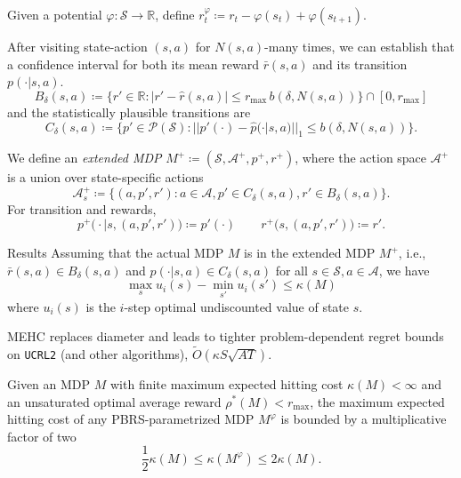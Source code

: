\documentclass[final]{beamer}
\newlength{\colwidth}
\begin{document}
\begin{frame}[t]
\begin{columns}[t]
\begin{column}{\colwidth}
  Given a potential $\varphi : \mathcal{S} \rightarrow \mathbb{R}$, define $r^\varphi_t \coloneqq r_t -\varphi(s_{t}) + \varphi(s_{t+1})$.
    
  After visiting state-action $(s, a)$ for $N(s, a)$-many times, we can establish that a confidence interval for both its mean reward $\bar{r}(s, a)$ and its transition $p(\cdot|s, a)$. 
  $$ B_\delta(s, a) \coloneqq \big\{r' \in \mathbb{R} : |r' - \hat{r}(s, a)| \leq r_\text{max} \, b(\delta, N(s, a)) \big\} \cap [0, r_\text{max}] $$
  and the statistically plausible transitions are
  $$ C_\delta(s, a) \coloneqq \big\{p' \in \mathcal{P}(\mathcal{S}) : ||p'(\cdot) - \hat{p}(\cdot|s, a)||_1 \leq b(\delta, N(s, a)) \big\}. $$

  We define an \emph{extended MDP} $M^+ \coloneqq (\mathcal{S}, \mathcal{A}^+, p^+, r^+)$, where the action space $\mathcal{A}^+$ is a union over state-specific actions
  $$ \mathcal{A}^+_s \coloneqq \{ (a, p', r') : a \in \mathcal{A}, p' \in C_\delta(s, a), r' \in B_\delta(s, a) \}. $$
  For transition and rewards, 
  $$ p^+\big(\cdot|s, (a, p', r') \big) \coloneqq p'(\cdot) \qquad r^+\big(s, (a, p', r')\big) \coloneqq r'. $$
    
  \begin{block}{Results}
  Assuming that the actual MDP $M$ is in the extended MDP $M^+$, i.e., $\bar{r}(s, a) \in B_\delta(s, a)$ and $p(\cdot|s, a) \in C_\delta(s, a)$ for all $s \in \mathcal{S}, a \in \mathcal{A}$, we have
  $$ \max_s u_i(s) - \min_{s'} u_i(s') \leq \kappa(M) $$
  where $u_i(s)$ is the $i$-step optimal undiscounted value of state $s$.

  MEHC replaces diameter and leads to tighter problem-dependent regret bounds on \texttt{UCRL2} (and other algorithms), $\widetilde{O}(\kappa S \sqrt{A T})$.

  Given an MDP $M$ with finite maximum expected hitting cost $\kappa(M) < \infty$ and an unsaturated optimal average reward $\rho^*(M) < r_\text{max}$, the maximum expected hitting cost of any PBRS-parametrized MDP $M^\varphi$ is bounded by a multiplicative factor of two
  $$ \frac{1}{2} \kappa(M) \leq \kappa(M^\varphi) \leq 2 \kappa(M). $$
  

\end{block}
\end{column}
\end{columns}
\end{frame}
\end{document}
